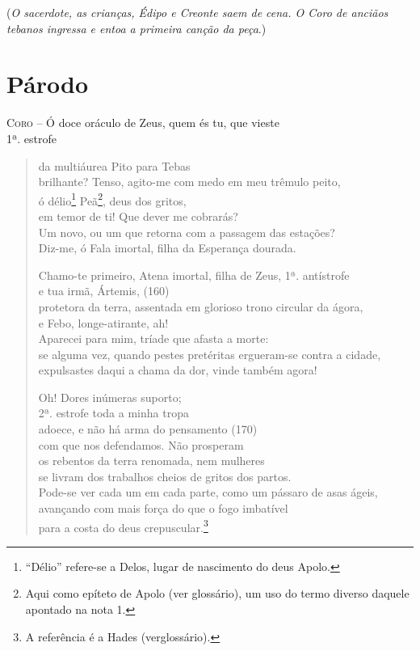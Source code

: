 (\emph{O sacerdote, as crianças, Édipo e Creonte saem de cena. O Coro de
anciãos tebanos ingressa e entoa a primeira canção da peça}.)


\section{Párodo}

\textsc{Coro} --   Ó doce oráculo de Zeus, quem és tu, que vieste\\ 1ª. estrofe
\begin{verse}da multiáurea Pito para Tebas\\
brilhante? Tenso, agito-me com medo em meu trêmulo peito,\\
ó délio\footnote{``Délio'' refere-se a Delos, lugar de nascimento do
deus Apolo.} Peã\footnote{Aqui como epíteto de Apolo (ver glossário),
um uso do termo diverso daquele apontado na nota 1.}, deus dos gritos,\\
em temor de ti! Que dever me cobrarás?\\
Um novo, ou um que retorna com a passagem das estações?\\
Diz-me, ó Fala imortal, filha da Esperança dourada.

Chamo-te primeiro, Atena imortal, filha de Zeus, 1ª. antístrofe\\
e tua irmã, Ártemis, (160)\\
protetora da terra, assentada em glorioso trono circular da ágora,\\
e Febo, longe-atirante, ah!\\
Aparecei para mim, tríade que afasta a morte:\\
se alguma vez, quando pestes pretéritas ergueram-se contra a cidade,\\
expulsastes daqui a chama da dor, vinde também agora!

Oh! Dores inúmeras suporto;\\ 2ª. estrofe
toda a minha tropa\\
adoece, e não há arma do pensamento (170)\\
com que nos defendamos. Não prosperam\\
os rebentos da terra renomada, nem mulheres\\
se livram dos trabalhos cheios de gritos dos partos.\\
Pode-se ver cada um em cada parte, como um pássaro de asas ágeis,\\
avançando com mais força do que o fogo imbatível\\
para a costa do deus crepuscular.\footnote{A referência é a Hades (verglossário).}


\end{verse}
